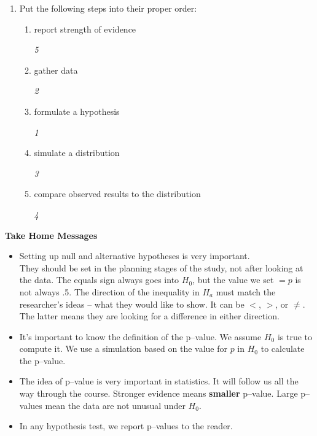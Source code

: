 \begin{enumerate}
\begin{key}
{\it By comparing the observed result to a distribution we get when
  $H_0$ is true. Take the points as or more extreme and divide by the
  number of points.}
\end{key}

\item  Put the following steps into their proper order:
 \begin{enumerate}
      \item  report strength of evidence 
\begin{key}
          {\it 5}
\end{key}
      \item  gather data 
\begin{key}
        {\it  2}
\end{key}

      \item  formulate a hypothesis 
\begin{key}
{\it 1   }
\end{key}


      \item  simulate a distribution 
\begin{key}
        {\it  3}
\end{key}
      \item  compare observed results to the distribution 
\begin{key}
        {\it  4}
\end{key}

  \end{enumerate}
\end{enumerate}

{\bf Take Home Messages}
\begin{itemize}
  \item Setting up null and alternative hypotheses is very
    important.\\
    They should be set in the planning stages of the study, not after
    looking at the data. 
    The equals sign always goes into $H_0$, but the value we set $ = p$ is not
    always .5.  The direction of the inequality in $H_a$ must match
    the researcher's ideas -- what they would like to show. It can be
    $<$, $>$, or $\neq$.  The latter means they are looking for a
    difference in either direction.
  \item It's important to know the definition of the p--value. We
    assume $H_0$ is true to compute it.  We  use a simulation based
    on the  value for $p$  in $H_0$ to calculate the p--value.    
  \item The idea of p--value is very important in statistics. It will
    follow us all the way through the course. Stronger evidence means
    {\bf smaller} p--value.  Large p--values mean the data are not
    unusual under $H_0$.
  \item In any hypothesis test, we report p--values to the reader.  
\end{itemize}\vfill

